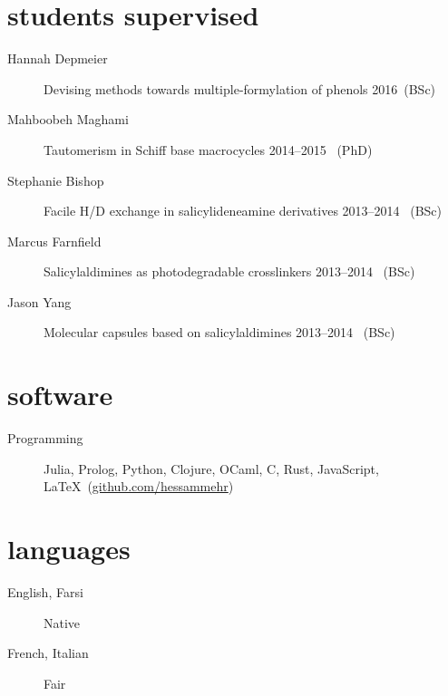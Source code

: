 \documentclass[overlapped,line,10pt,letterpaper]{res}
\begin{document}
\begin{resume}
\section{students supervised}
\begin{description}
\item[Hannah Depmeier] Devising methods towards multiple-formylation of phenols \hspace{\fill} 2016\, (BSc)
\item[Mahboobeh Maghami] Tautomerism in Schiff base macrocycles \hspace{\fill} 2014–2015 \, (PhD)
\item[Stephanie Bishop] Facile H/D exchange in salicylideneamine derivatives \hspace{\fill} 2013–2014 \, (BSc)
\item[Marcus Farnfield]  Salicylaldimines as photodegradable crosslinkers \hspace{\fill} 2013–2014 \, (BSc)
\item[Jason Yang]  Molecular capsules based on salicylaldimines \hspace{\fill} 2013–2014 \, (BSc)
\end{description}

\section{software}
\begin{description}
\item[Programming] Julia, Prolog, Python, Clojure, OCaml, C, Rust, JavaScript, \LaTeX \ (\href{https://github.com/hessammehr}{github.com/hessammehr})
\end{description}

\section{languages}
\begin{description}
\item[English, Farsi] Native
\item[French, Italian] Fair
\end{description}
\end{resume}
\end{document}

